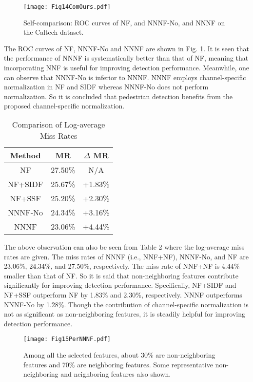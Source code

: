 \documentclass[10pt,twocolumn,letterpaper]{article}
\begin{document}
\begin{figure}[!t]
\centering
\texttt{[image: Fig14ComOurs.pdf]}
\caption{ Self-comparison: ROC curves of NF, and NNNF-No, and NNNF on the Caltech dataset.}
\label{FigComOurs}
\end{figure}


The ROC curves of NF, NNNF-No and NNNF are shown in Fig. \ref{FigComOurs}. It is seen that 
the performance of NNNF is systematically better than that of NF, meaning 
that incorporating NNF is useful for improving detection performance. 
Meanwhile, one can observe that NNNF-No is inferior to NNNF. NNNF employs 
channel-specific normalization in NF and SIDF whereas 
NNNF-No does not perform normalization. So it is concluded that pedestrian 
detection benefits from the proposed channel-specific normalization. 

\begin{table}
\begin{center}
\begin{tabular}{c c c }
\hline
Method & MR        &$\Delta$ MR \\
\hline
NF     & 27.50\%   & N/A \\
NF+SIDF & 25.67\%  & +1.83\% \\
NF+SSF & 25.20\%   & +2.30\% \\
NNNF-No & 24.34\%   & +3.16\% \\
NNNF   & 23.06\%      & +4.44\%\\
\hline
\end{tabular}
\end{center}
\caption{Comparison of Log-average Miss Rates}
\end{table}

The above observation can also be seen from Table 2 where the log-average 
miss rates are given. The miss rates of NNNF 
(i.e., NNF+NF), NNNF-No, and NF are 23.06{\%}, 24.34{\%}, and 27.50{\%}, 
respectively. The miss rate of NNF+NF is 4.44{\%} smaller than 
that of NF. So it is said that non-neighboring features contribute 
significantly for improving detection performance. Specifically, NF+SIDF and 
NF+SSF outperform NF by 1.83{\%} and 2.30{\%}, respectively. NNNF 
outperforms NNNF-No by 1.28{\%}. Though the contribution of channel-specific 
normalization is not as significant as non-neighboring features, it is 
steadily helpful for improving detection performance.

\begin{figure}[!t]
\centering
\texttt{[image: Fig15PerNNNF.pdf]}
\caption{ Among all the selected features, about 30\% are non-neighboring features and 70\% are neighboring features. Some representative non-neighboring and neighboring features also shown.}
\label{FigPerNNNF}
\end{figure}
\end{document}
